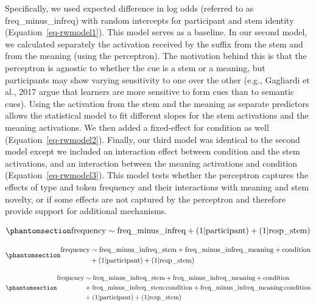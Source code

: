 \documentclass[
  letterpaper,
  DIV=11,
  numbers=noendperiod]{scrartcl}
\begin{document}
Specifically, we used expected difference in log odds (referred to as
freq\_minus\_infreq) with random intercepts for participant and stem
identity (Equation~\ref{eq-rwmodel1}). This model serves as a baseline.
In our second model, we calculated separately the activation received by
the suffix from the stem and from the meaning (using the perceptron).
The motivation behind this is that the perceptron is agnostic to whether
the cue is a stem or a meaning, but participants may show varying
sensitivity to one over the other (e.g., Gagliardi et al., 2017 argue
that learners are more sensitive to form cues than to semantic cues).
Using the activation from the stem and the meaning as separate
predictors allows the statistical model to fit different slopes for the
stem activations and the meaning activations. We then added a
fixed-effect for condition as well (Equation~\ref{eq-rwmodel2}).
Finally, our third model was identical to the second model except we
included an interaction effect between condition and the stem
activations, and an interaction between the meaning activations and
condition (Equation~\ref{eq-rwmodel3}). This model tests whether the
perceptron captures the effects of type and token frequency and their
interactions with meaning and stem novelty, or if some effects are not
captured by the perceptron and therefore provide support for additional
mechanisms.

\begin{equation}\phantomsection\label{eq-rwmodel1}{
\text{frequency} \sim \text{freq\_minus\_infreq} + (1 | \text{participant}) + (1|\text{resp\_stem})
}\end{equation}

\begin{equation}\phantomsection\label{eq-rwmodel2}{
\begin{aligned}
\text{frequency} & \sim \text{freq\_minus\_infreq\_stem} + \text{freq\_minus\_infreq\_meaning} + \text{condition} \\ & +  (1 | \text{participant}) + (1|\text{resp\_stem})
\end{aligned}
}\end{equation}

\begin{equation}\phantomsection\label{eq-rwmodel3}{
\begin{aligned}
\text{frequency} & \sim \text{freq\_minus\_infreq\_stem} + \text{freq\_minus\_infreq\_meaning} + \text{condition} \\ & + \text{freq\_minus\_infreq\_stem:condition} + \text{freq\_minus\_infreq\_meaning:condition} \\ & + (1 | \text{participant}) + (1|\text{resp\_stem})
\end{aligned}
}\end{equation}
\end{document}
